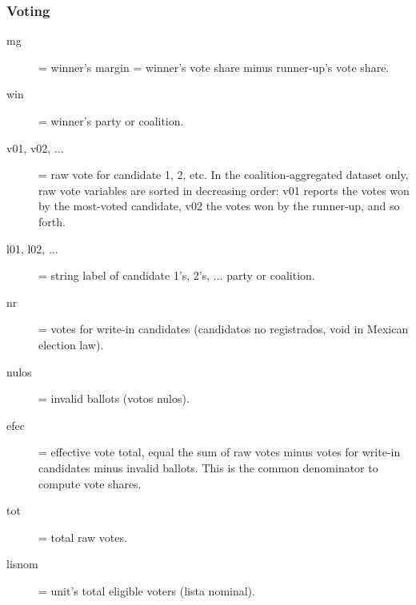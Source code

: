 \documentclass[letter,12pt]{article}
\begin{document}
\begin{singlespace}
\subsubsection{Voting}
\begin{description}
\item[mg] = winner's margin = winner's vote share minus runner-up's vote share.
\item[win] = winner's party or coalition.
\item[v01, v02, ...] = raw vote for candidate 1, 2, etc. In the coalition-aggregated dataset only, raw vote variables are sorted in decreasing order: v01 reports the votes won by the most-voted candidate, v02 the votes won by the runner-up, and so forth.
\item[l01, l02, ...] = string label of candidate 1's, 2's, ... party or coalition.
\item[nr] = votes for write-in candidates (candidatos no registrados, void in Mexican election law).
\item[nulos] = invalid ballots (votos nulos).
\item[efec] = effective vote total, equal the sum of raw votes minus votes for write-in candidates minus invalid ballots. This is the common denominator to compute vote shares.
\item[tot] = total raw votes.
\item[lisnom] = unit's total eligible voters (lista nominal).
\end{description}

\end{singlespace}
\end{document}
